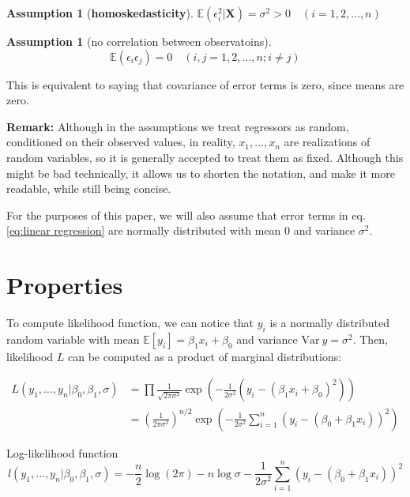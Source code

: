 \documentclass[12pt,a4paper,oneside]{book} %
\newtheorem{assumption}[theorem]{Assumption}
\newcommand{\E}{\mathbb{E}}
\newcommand{\Var}{\mathrm{Var}}
\begin{document}
\begin{assumption}[\textbf{homoskedasticity}]
	$\E(\epsilon_i^2| \mathbf{X}) = \sigma^2 > 0 \quad (i=1,2,...,n)$
\end{assumption}

\begin{assumption}[no correlation between observatoins]
	\[\E (\epsilon_i \epsilon_j) = 0 \quad (i,j = 1, 2, ..., n; i \neq j) \]
\end{assumption}

This is equivalent to saying that covariance of error terms is zero, since means are zero.

\textbf{Remark:}  Although in the assumptions we treat regressors as random, conditioned on their observed values, in reality, $x_1, ..., x_n$ are realizations of random variables, so it is generally accepted to treat them as fixed. Although this might be bad technically, it allows us to shorten the notation, and make it more readable, while still being concise.

For the purposes of this paper, we will also assume that error terms in eq. \ref{eq:linear regression}  are normally distributed with mean 0 and variance $\sigma^2$.

\section{Properties}

To compute likelihood function, we can notice that $y_i$ is a normally distributed random variable with mean $\E [y_i] = \beta_1 x_i + \beta_0$ and variance $\Var \ y = \sigma^2$. Then, likelihood $L$ can be computed as a product of marginal distributions:

\begin{align}
	L(y_1, \ldots, y_n | \beta_0, \beta_1, \sigma) &= \prod \frac{1}{\sqrt{2 \pi \sigma^2}} \exp (-\frac{1}{2\sigma^2}(y_i-(\beta_1 x_i + \beta_0)^2))\\
	&= \left( \frac{1}{2\pi\sigma^2} \right)^{n/2} \exp\left( -\frac{1}{2\sigma^2} \sum_{i=1}^{n} (y_i - (\beta_0 + \beta_1 x_i))^2 \right)
\end{align}


Log-likelihood function
\begin{equation} \label{eq:loglikelihood}
	l(y_1, \ldots, y_n | \beta_0, \beta_1, \sigma) = -\frac{n}{2} \log (2 \pi) - n \log \sigma - \frac{1}{2\sigma^2} \sum_{i=1}^{n} (y_i - (\beta_0 + \beta_1 x_i))^2
\end{equation}
\end{document}

